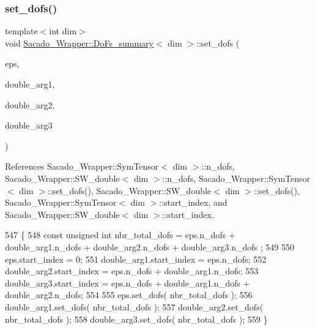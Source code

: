 \subsubsection{\texorpdfstring{set\+\_\+dofs()}{set\_dofs()}\hspace{0.1cm}{\footnotesize\ttfamily [2/3]}}
{\footnotesize\ttfamily template$<$int dim$>$ \\
void \hyperlink{classSacado__Wrapper_1_1DoFs__summary}{Sacado\+\_\+\+Wrapper\+::\+Do\+Fs\+\_\+summary}$<$ dim $>$\+::set\+\_\+dofs (\begin{DoxyParamCaption}\item[{\hyperlink{classSacado__Wrapper_1_1SymTensor}{Sym\+Tensor}$<$ dim $>$ \&}]{eps,  }\item[{\hyperlink{classSacado__Wrapper_1_1SW__double}{S\+W\+\_\+double}$<$ dim $>$ \&}]{double\+\_\+arg1,  }\item[{\hyperlink{classSacado__Wrapper_1_1SW__double}{S\+W\+\_\+double}$<$ dim $>$ \&}]{double\+\_\+arg2,  }\item[{\hyperlink{classSacado__Wrapper_1_1SW__double}{S\+W\+\_\+double}$<$ dim $>$ \&}]{double\+\_\+arg3 }\end{DoxyParamCaption})}



References Sacado\+\_\+\+Wrapper\+::\+Sym\+Tensor$<$ dim $>$\+::n\+\_\+dofs, Sacado\+\_\+\+Wrapper\+::\+S\+W\+\_\+double$<$ dim $>$\+::n\+\_\+dofs, Sacado\+\_\+\+Wrapper\+::\+Sym\+Tensor$<$ dim $>$\+::set\+\_\+dofs(), Sacado\+\_\+\+Wrapper\+::\+S\+W\+\_\+double$<$ dim $>$\+::set\+\_\+dofs(), Sacado\+\_\+\+Wrapper\+::\+Sym\+Tensor$<$ dim $>$\+::start\+\_\+index, and Sacado\+\_\+\+Wrapper\+::\+S\+W\+\_\+double$<$ dim $>$\+::start\+\_\+index.


\begin{DoxyCode}
547     \{
548         \textcolor{keyword}{const} \textcolor{keywordtype}{unsigned} \textcolor{keywordtype}{int} nbr\_total\_dofs = eps.n\_dofs + double\_arg1.n\_dofs + double\_arg2.n\_dofs + 
      double\_arg3.n\_dofs ;
549 
550         eps.start\_index = 0;
551         double\_arg1.start\_index = eps.n\_dofs;
552         double\_arg2.start\_index = eps.n\_dofs + double\_arg1.n\_dofs;
553         double\_arg3.start\_index = eps.n\_dofs + double\_arg1.n\_dofs + double\_arg2.n\_dofs;
554 
555         eps.set\_dofs( nbr\_total\_dofs );
556         double\_arg1.set\_dofs( nbr\_total\_dofs );
557         double\_arg2.set\_dofs( nbr\_total\_dofs );
558         double\_arg3.set\_dofs( nbr\_total\_dofs );
559     \}
\end{DoxyCode}
\mbox{\label{classSacado__Wrapper_1_1DoFs__summary_a1fa50906ae3965c47656a4bb3c781811}} 
